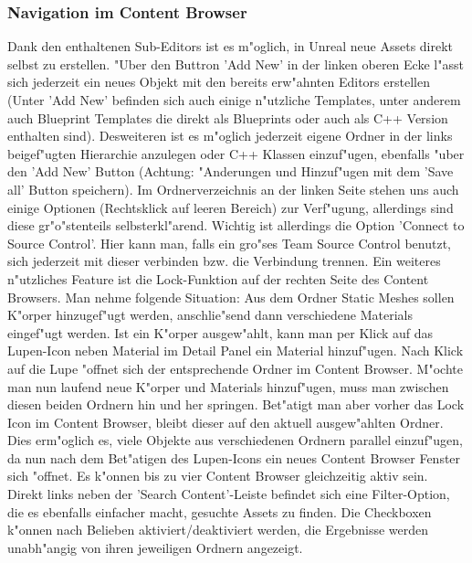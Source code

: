 \documentclass[11pt, titlepage]{article}
\begin{document}
\subsubsection{Navigation im Content Browser}

\noindent Dank den enthaltenen Sub-Editors ist es m"oglich, in Unreal neue Assets direkt selbst zu erstellen. "Uber den Buttron 'Add New' in der linken oberen Ecke l"asst sich jederzeit ein neues Objekt mit den bereits erw"ahnten Editors erstellen (Unter 'Add New' befinden sich auch einige n"utzliche Templates, unter anderem auch Blueprint Templates die direkt als Blueprints oder auch als C++ Version enthalten sind). Desweiteren ist es m"oglich jederzeit eigene Ordner in der links beigef"ugten Hierarchie anzulegen oder C++ Klassen einzuf"ugen, ebenfalls "uber den 'Add New' Button (Achtung: "Anderungen und Hinzuf"ugen mit dem 'Save all' Button speichern). \newline
\newpage
\noindent Im Ordnerverzeichnis an der linken Seite stehen uns auch einige Optionen (Rechtsklick auf leeren Bereich) zur Verf"ugung, allerdings sind diese gr"o"stenteils selbsterkl"arend. Wichtig ist allerdings die Option 'Connect to Source Control'. Hier kann man, falls ein gro"ses Team Source Control benutzt, sich jederzeit mit dieser verbinden bzw. die Verbindung trennen. \newline
\newline
\noindent Ein weiteres n"utzliches Feature ist die Lock-Funktion auf der rechten Seite des Content Browsers. Man nehme folgende Situation: Aus dem Ordner Static Meshes sollen K"orper hinzugef"ugt werden, anschlie"send dann verschiedene Materials eingef"ugt werden. Ist ein K"orper ausgew"ahlt, kann man per Klick auf das Lupen-Icon neben Material im Detail Panel ein Material hinzuf"ugen. Nach Klick auf die Lupe "offnet sich der entsprechende Ordner im Content Browser. M"ochte man nun laufend neue K"orper und Materials hinzuf"ugen, muss man zwischen diesen beiden Ordnern hin und her springen. Bet"atigt man aber vorher das Lock Icon im Content Browser, bleibt dieser auf den aktuell ausgew"ahlten Ordner. Dies erm"oglich es, viele Objekte aus verschiedenen Ordnern parallel einzuf"ugen, da nun nach dem Bet"atigen des Lupen-Icons ein neues Content Browser Fenster sich "offnet. Es k"onnen bis zu vier Content Browser gleichzeitig aktiv sein. \newline
\newline
\noindent Direkt links neben der 'Search Content'-Leiste befindet sich eine Filter-Option, die es ebenfalls einfacher macht, gesuchte Assets zu finden. Die Checkboxen k"onnen nach Belieben aktiviert/deaktiviert werden, die Ergebnisse werden unabh"angig von ihren jeweiligen Ordnern angezeigt.\newline
\end{document}
